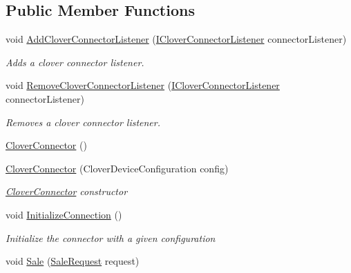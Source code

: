 \subsection*{Public Member Functions}
\begin{DoxyCompactItemize}
\item 
void \hyperlink{classcom_1_1clover_1_1remotepay_1_1sdk_1_1_clover_connector_aebd32d30edf2691cafd56d8540597d9a}{Add\+Clover\+Connector\+Listener} (\hyperlink{interfacecom_1_1clover_1_1remotepay_1_1sdk_1_1_i_clover_connector_listener}{I\+Clover\+Connector\+Listener} connector\+Listener)
\begin{DoxyCompactList}\small\item\em Adds a clover connector listener. \end{DoxyCompactList}\item 
void \hyperlink{classcom_1_1clover_1_1remotepay_1_1sdk_1_1_clover_connector_a05aa30b8a934164519333645e267c2e5}{Remove\+Clover\+Connector\+Listener} (\hyperlink{interfacecom_1_1clover_1_1remotepay_1_1sdk_1_1_i_clover_connector_listener}{I\+Clover\+Connector\+Listener} connector\+Listener)
\begin{DoxyCompactList}\small\item\em Removes a clover connector listener. \end{DoxyCompactList}\item 
\hyperlink{classcom_1_1clover_1_1remotepay_1_1sdk_1_1_clover_connector_af553c32b3c901aa83068662606843da0}{Clover\+Connector} ()
\item 
\hyperlink{classcom_1_1clover_1_1remotepay_1_1sdk_1_1_clover_connector_acc9fab2e3c5832509009d8c40a8eefe8}{Clover\+Connector} (Clover\+Device\+Configuration config)
\begin{DoxyCompactList}\small\item\em \hyperlink{classcom_1_1clover_1_1remotepay_1_1sdk_1_1_clover_connector}{Clover\+Connector} constructor \end{DoxyCompactList}\item 
void \hyperlink{classcom_1_1clover_1_1remotepay_1_1sdk_1_1_clover_connector_ae103900f25165ad063e914698e0aeb5d}{Initialize\+Connection} ()
\begin{DoxyCompactList}\small\item\em Initialize the connector with a given configuration \end{DoxyCompactList}\item 
void \hyperlink{classcom_1_1clover_1_1remotepay_1_1sdk_1_1_clover_connector_a1adbcc8a0d4aaa82157a102af4f16b91}{Sale} (\hyperlink{classcom_1_1clover_1_1remotepay_1_1sdk_1_1_sale_request}{Sale\+Request} request)

\end{DoxyCompactItemize}
